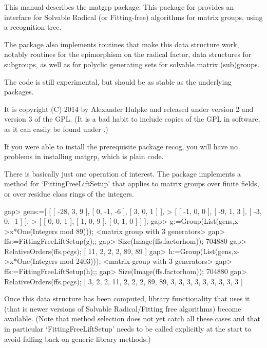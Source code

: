 %
%
%
%


This manual describes the {\sf matgrp} package. This package for {\GAP}
provides an interface for Solvable Radical (or Fitting-free) algorithms for
matrix groups, using a recognition tree.

The package also implements routines that make this data structure work,
notably routines for the epimorphism on the radical factor, data structures for subgroups, as well as for polyclic
generating sets for solvable matrix (sub)groups.

The code is still experimental, but should be as stable as the underlying
packages.

It is copyright (C) 2014 by Alexander Hulpke and released under version 2
and version 3 of the GPL. (It is a bad habit to include copies of the GPL in
software, as it can easily be found under
.)

If you were able to install the prerequisite package {\sf recog}, you will
have no problems in installing {\sf matgrp}, which is plain {\GAP} code.


There is basically just one operation of interest. The package implements a
method for `FittingFreeLiftSetup' that applies to matrix groups over finite
fields, or over residue class rings of the integers.

\beginexample
gap> gens:=[ [ [ -28, 3, 9 ], [ 0, -1, -6 ], [ 3, 0, 1 ] ],   
>   [ [ -1, 0, 0 ], [ -9, 1, 3 ], [ -3, 0, -1 ] ], 
>   [ [ 0, 0, 1 ], [ 1, 0, 9 ], [ 0, 1, 0 ] ] ];
gap> g:=Group(List(gens,x->x*One(Integers mod 89))); 
<matrix group with 3 generators>
gap> ffs:=FittingFreeLiftSetup(g);;
gap> Size(Image(ffs.factorhom));
704880
gap> RelativeOrders(ffs.pcgs);
[ 11, 2, 2, 2, 89, 89 ]
gap> h:=Group(List(gens,x->x*One(Integers mod 2403)));
<matrix group with 3 generators>
gap> ffs:=FittingFreeLiftSetup(h);;
gap> Size(Image(ffs.factorhom));
704880
gap> RelativeOrders(ffs.pcgs);
[ 3, 2, 2, 11, 2, 2, 2, 89, 89, 3, 3, 3, 3, 3, 3, 3, 3, 3 ]
\endexample

Once this data structure has been computed, library functionality that uses
it (that is newer versions of Solvable Radical/Fitting free algorithms)
become available. (Note that method selection does not yet catch all these
cases and that in particular `FittingFreeLiftSetup' needs to be called
explicitly at the start to avoid falling back on generic library methods.)

